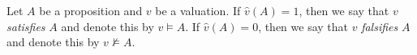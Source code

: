 

\setcounter{section}{1}
\setcounter{subsection}{3}
\setcounter{dfn}{3}

\begin{dfn}
Let $A$ be a proposition and $v$ be a valuation.
If $\hat{v}(A) = 1$, then we say that $v$ \emph{satisfies} $A$ and denote this by $v \vDash A$.
If $\hat{v}(A) = 0$, then we say that $v$ \emph{falsifies} $A$ and denote this by $v \nvDash A$.
\end{dfn}


